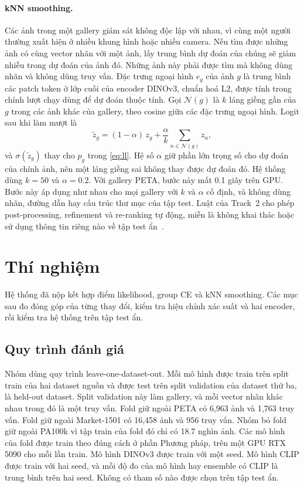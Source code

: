 \documentclass[10pt,twocolumn,letterpaper]{article}
\begin{document}
\paragraph{kNN smoothing.} Các ảnh trong một gallery giám sát không độc lập với nhau, vì cùng một người thường xuất hiện ở nhiều khung hình hoặc nhiều camera. Nếu tìm được những ảnh có cùng vector nhãn với một ảnh, lấy trung bình dự đoán của chúng sẽ giảm nhiễu trong dự đoán của ảnh đó. Những ảnh này phải được tìm mà không dùng nhãn và không dùng truy vấn. Đặc trưng ngoại hình $e_g$ của ảnh $g$ là trung bình các patch token ở lớp cuối của encoder DINOv3, chuẩn hoá L2, được tính trong chính lượt chạy dùng để dự đoán thuộc tính. Gọi $\mathcal{N}(g)$ là $k$ láng giềng gần của $g$ trong các ảnh khác của gallery, theo cosine giữa các đặc trưng ngoại hình. Logit sau khi làm mượt là
\begin{equation}
\tilde z_g=(1-\alpha)\,z_g+\frac{\alpha}{k}\sum_{n\in\mathcal{N}(g)}z_n,
\label{eq:knn}
\end{equation}
và $\sigma(\tilde z_g)$ thay cho $p_g$ trong \cref{eq:ll}. Hệ số $\alpha$ giữ phần lớn trọng số cho dự đoán của chính ảnh, nên một láng giềng sai không thay được dự đoán đó. Hệ thống dùng $k=50$ và $\alpha=0.2$. Với gallery PETA, bước này mất 0.1 giây trên GPU. Bước này áp dụng như nhau cho mọi gallery với $k$ và $\alpha$ cố định, và không dùng nhãn, đường dẫn hay cấu trúc thư mục của tập test. Luật của Track~2 cho phép post-processing, refinement và re-ranking tự động, miễn là không khai thác hoặc sử dụng thông tin riêng nào về tập test ẩn~\cite{rules}.

\section{Thí nghiệm}
\label{sec:exp}

Hệ thống đã nộp kết hợp điểm likelihood, group CE và kNN smoothing. Các mục sau đo đóng góp của từng thay đổi, kiểm tra hiệu chỉnh xác suất và hai encoder, rồi kiểm tra hệ thống trên tập test ẩn.

\subsection{Quy trình đánh giá}
\label{sec:protocol}
Nhóm dùng quy trình leave-one-dataset-out. Mỗi mô hình được train trên split train của hai dataset nguồn và được test trên split validation của dataset thứ ba, là held-out dataset. Split validation này làm gallery, và mỗi vector nhãn khác nhau trong đó là một truy vấn. Fold giữ ngoài PETA có 6,963 ảnh và 1,763 truy vấn. Fold giữ ngoài Market-1501 có 16,458 ảnh và 956 truy vấn. Nhóm bỏ fold giữ ngoài PA100k vì tập train của fold đó chỉ có 18.7 nghìn ảnh. Các mô hình của fold được train theo đúng cách ở phần Phương pháp, trên một GPU RTX 5090 cho mỗi lần train. Mô hình DINOv3 được train với một seed. Mô hình CLIP được train với hai seed, và mỗi độ đo của mô hình hay ensemble có CLIP là trung bình trên hai seed. Không có tham số nào được chọn trên tập test ẩn.
\end{document}
